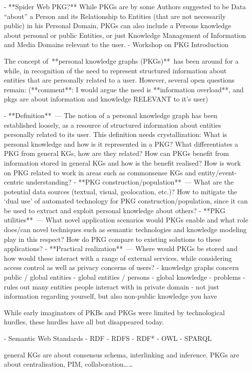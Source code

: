- **Spider Web PKG?** While PKGs are by some Authors suggested to be Data “about” a Person and its Relationship to Entities (that are not necessarily public) in his Personal Domain, PKGs can also include a Persons knowledge about personal or public Entities, or just Knowledge Management of Information and Media Domains relevant to the user.
- Workshop on PKG Introduction
    
    The concept of **personal knowledge graphs (PKGs)** has been around for a while, in recognition of the need to represent structured information about entities that are personally related to a user. However, several open questions remain: (**comment**: I would argue the need is **information overload**, and pkgs are about information and knowledge RELEVANT to it’s user)
    
    - **Definition** — The notion of a personal knowledge graph has been established loosely, as a resource of structured information about entities personally related to its user. This definition needs crystallization: What is personal knowledge and how is it represented in a PKG? What differentiates a PKG from general KGs, how are they related? How can PKGs benefit from information stored in general KGs and how is the benefit realised? How is work on PKG related to work in areas such as commonsense KGs and entity/event-centric understanding?
    - **PKG construction/population** — What are the potential data sources (textual, visual, geolocation, etc.)? How to mitigate the ‘dual use’ of automated technology for PKG construction/population, since it can be used to extract and exploit personal knowledge about others?
    - **PKG utilities** — What novel application scenarios would PKGs enable and what role does/can novel techniques such as semantic technologies and knowledge modeling play in this respect? How do PKG compare to existing solutions to these applications?
    - **Practical realization** — Where would PKGs be stored and how would these interact with a range of external services, while considering access control as well as privacy concerns of users?
- knowledge graphs concern public / global entities
    - global entities / persons
    - global knowledge
    - problems
        - rules out many entities people interact with in private domain
        - not just information regarding yourself, but also non-public knowledge you have

While early imaginators of PKBs and PKGs were limited by technological hurdles, these hurdles have all but disappeared today.

- Semantic Web Standards
    - RDF
    - RDFS
    - RDF*
    - OWL
    - SPARQL

general KGs are about consensus schema, interlinking and inference. PKGs are about centralisation, PIM, collaboration……
